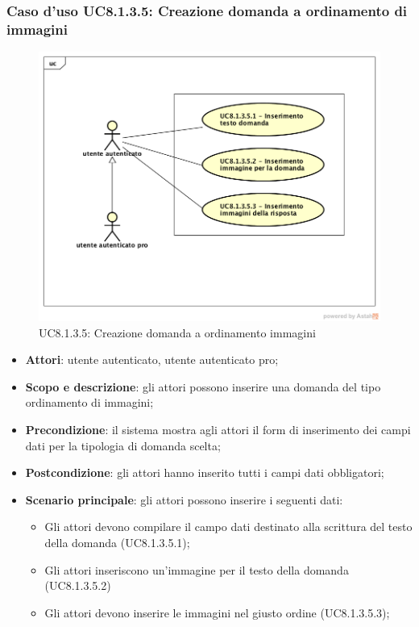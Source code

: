 \subsubsection{Caso d’uso UC8.1.3.5: Creazione domanda a ordinamento di immagini}
\label{UC8.1}
	\begin{figure}[h]
		\centering
			\includegraphics[scale=0.45,keepaspectratio]{UML/UC8_1_3_5.png}
		\caption{UC8.1.3.5: Creazione domanda a ordinamento immagini}
	\end{figure}
\begin{itemize}
	\item\textbf{Attori}: utente autenticato, utente autenticato pro;
	\item\textbf{Scopo e descrizione}: gli attori possono inserire una domanda del tipo ordinamento di immagini;
	\item\textbf{Precondizione}: il sistema mostra agli attori il form di inserimento dei campi dati per la tipologia di domanda scelta; 
	\item \textbf{Postcondizione}: gli attori hanno inserito tutti i campi dati obbligatori;
	\item\textbf{Scenario principale}: gli attori possono inserire i seguenti dati:
	\begin{itemize}
		\item Gli attori devono compilare il campo dati destinato alla scrittura del testo della domanda (UC8.1.3.5.1);
		\item Gli attori inseriscono un'immagine per il testo della domanda (UC8.1.3.5.2)
		\item Gli attori devono inserire le immagini nel giusto ordine (UC8.1.3.5.3);
	\end{itemize}
\end{itemize}

